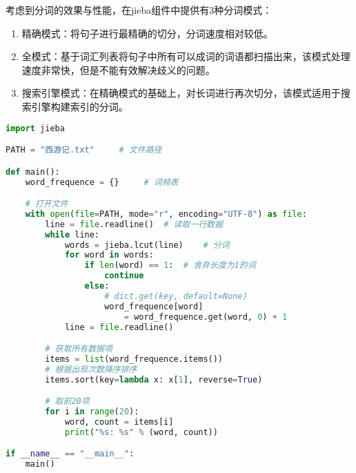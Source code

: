考虑到分词的效果与性能，在jieba组件中提供有3种分词模式：

\begin{enumerate}
	\item 精确模式：将句子进行最精确的切分，分词速度相对较低。

	\item 全模式：基于词汇列表将句子中所有可以成词的词语都扫描出来，该模式处理速度非常快，但是不能有效解决歧义的问题。

	\item 搜索引擎模式：在精确模式的基础上，对长词进行再次切分，该模式适用于搜索引擎构建索引的分词。
\end{enumerate}

\vspace{0.5cm}


\begin{lstlisting}[language=Python]
import jieba

PATH = "西游记.txt"     # 文件路径

def main():
    word_frequence = {}     # 词频表

    # 打开文件
    with open(file=PATH, mode="r", encoding="UTF-8") as file:
        line = file.readline()  # 读取一行数据
        while line:
            words = jieba.lcut(line)    # 分词
            for word in words:
                if len(word) == 1:  # 舍弃长度为1的词
                    continue
                else:
                    # dict.get(key, default=None)
                    word_frequence[word] 
                        = word_frequence.get(word, 0) + 1
            line = file.readline()

        # 获取所有数据项
        items = list(word_frequence.items())
        # 根据出现次数降序排序
        items.sort(key=lambda x: x[1], reverse=True)

        # 取前20项
        for i in range(20):
            word, count = items[i]
            print("%s: %s" % (word, count))

if __name__ == "__main__":
    main()
\end{lstlisting}

\newpage